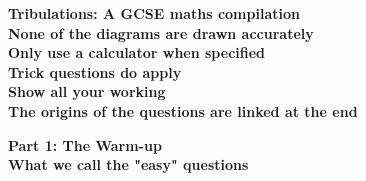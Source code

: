 \documentclass{exam}
\begin{document}
\pagestyle{empty}

\begin{titlepage}
    \begin{center}

        \vspace*{\fill}
        \textbf{Tribulations: A GCSE maths compilation}\\
        \vspace*{1cm}
        \vspace*{1cm}
        \textbf{None of the diagrams are drawn accurately}\\
        \vspace*{1cm}
        \vspace*{1cm}
        \textbf{Only use a calculator when specified}\\
        \vspace*{1cm}
        \vspace*{1cm}
        \textbf{Trick questions do apply}\\
        \vspace*{1cm}
        \vspace*{1cm}
        \textbf{Show all your working}\\
        \vspace*{1cm}
        \vspace*{1cm}
        \textbf{The origins of the questions are linked at the end}\\
        \vspace*{\fill}
            
    \end{center}
\end{titlepage}
\newpage
\begin{titlepage}
    \begin{center}

        \vspace*{\fill}
        \Large \textbf{Part 1: The Warm-up}\\
        \vspace*{1cm}
        \vspace*{1cm}
        \small \textbf{What we call the "easy" questions}\\
        \vspace*{\fill}
        
    \end{center}
\end{titlepage}
\newpage
\end{document}
